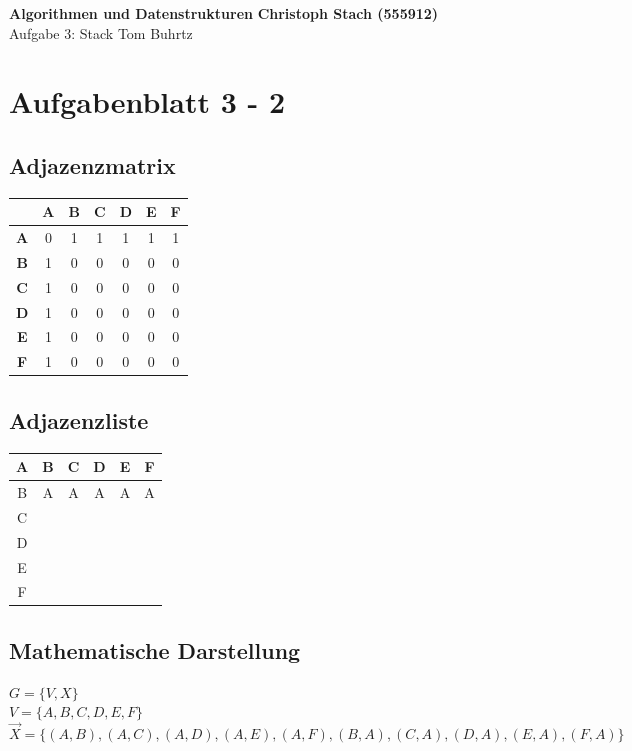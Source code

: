 \documentclass[a4paper, 11pt]{article}
\begin{document}
\noindent
\large\textbf{Algorithmen und Datenstrukturen} \hfill \textbf{Christoph Stach (555912)} \\
\normalsize Aufgabe 3: Stack \hfill Tom Buhrtz \\

\section*{Aufgabenblatt 3 - 2}

\subsection*{Adjazenzmatrix}
\begin{tabular}{ |c|c|c|c|c|c|c| }
\hline
 & \textbf{A} & \textbf{B} & \textbf{C} & \textbf{D} & \textbf{E} & \textbf{F} \\
\hline
\textbf{A} & 0 & 1 & 1 & 1 & 1 & 1 \\
\hline
\textbf{B} & 1 & 0 & 0 & 0 & 0 & 0 \\
\hline
\textbf{C} & 1 & 0 & 0 & 0 & 0 & 0 \\
\hline
\textbf{D} & 1 & 0 & 0 & 0 & 0 & 0 \\
\hline
\textbf{E} & 1 & 0 & 0 & 0 & 0 & 0 \\
\hline
\textbf{F} & 1 & 0 & 0 & 0 & 0 & 0 \\
\hline
\end{tabular}

\subsection*{Adjazenzliste}
\begin{tabular}{ |c|c|c|c|c|c| }
\hline
\textbf{A} & \textbf{B} & \textbf{C} & \textbf{D} & \textbf{E} & \textbf{F} \\
\hline
\hline
B & A & A & A & A & A \\
\hline
C & & & & & \\
\hline
D & & & & & \\
\hline
E & & & & & \\
\hline
F & & & & & \\
\hline
\end{tabular}


\subsection*{Mathematische Darstellung}
\( G = \{ V , X \} \) \\
\( V = \{ A , B , C , D , E , F \} \)  \\
\( \vec X = \{ (A,B) , (A,C) , (A,D) , (A,E) , (A,F) , (B,A) , (C,A) , (D,A) , (E,A) , (F,A) \} \)
\end{document}
